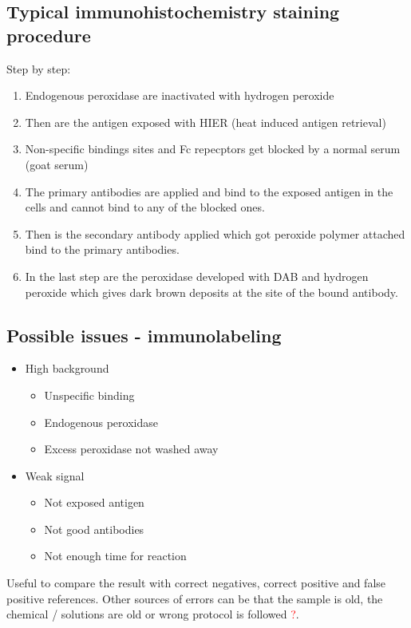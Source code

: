 	\subsection*{Typical immunohistochemistry staining procedure}
	Step by step:
	\begin{enumerate}
		\item Endogenous peroxidase are inactivated with hydrogen peroxide
		\item Then are the antigen exposed with HIER (heat induced antigen retrieval)
		\item Non-specific bindings sites and Fc repecptors get blocked by a normal serum (goat serum)
		\item The primary antibodies are applied and bind to the exposed antigen in the cells and cannot bind to any of the blocked ones. 
		\item Then is the secondary antibody applied which got peroxide polymer attached bind to the primary antibodies. 
		\item In the last step are the peroxidase developed with DAB and hydrogen peroxide which gives dark brown deposits at the site of the bound antibody.
	\end{enumerate}

	\subsection*{Possible issues - immunolabeling}
	
	\begin{itemize}
		\item High background
		\begin{itemize}
			\item Unspecific binding
			\item Endogenous peroxidase
			\item Excess peroxidase not washed away
		\end{itemize}
		\item Weak signal
		\begin{itemize}
			\item Not exposed antigen
			\item Not good antibodies
			\item Not enough time for reaction
		\end{itemize}
	\end{itemize}
	
	Useful to compare the result with correct negatives, correct positive and false positive references. Other sources of errors can be that the sample is old, the chemical / solutions are old or wrong protocol is followed \textcolor{red}{?}. 


